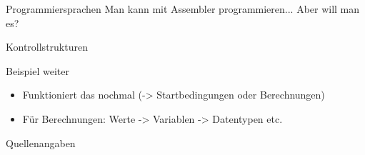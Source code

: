 \documentclass[aspectratio=169,t]{beamer}
\begin{document}
\begin{frame}{Programmiersprachen}
	Man kann mit Assembler programmieren... Aber will man es?
\end{frame}

\begin{frame}{Kontrollstrukturen}
\end{frame}

\begin{frame}{Beispiel weiter}
	\begin{itemize}
		\item Funktioniert das nochmal (-> Startbedingungen oder Berechnungen)
		\item Für Berechnungen: Werte -> Variablen -> Datentypen etc.
	\end{itemize}
\end{frame}

\begin{frame}[allowframebreaks]{Quellenangaben}
    \printbibliography
\end{frame}


\end{document}
